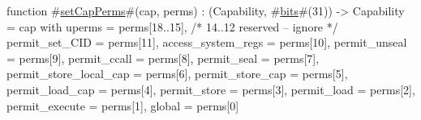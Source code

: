 function #\hyperref[sailMIPSzsetCapPerms]{setCapPerms}#(cap, perms) : (Capability, #\hyperref[sailMIPSzbits]{bits}#(31)) -> Capability =
    { cap with
      uperms                 = perms[18..15],
      /* 14..12 reserved -- ignore */
      permit_set_CID         = perms[11],
      access_system_regs     = perms[10],
      permit_unseal          = perms[9],
      permit_ccall           = perms[8],
      permit_seal            = perms[7],
      permit_store_local_cap = perms[6],
      permit_store_cap       = perms[5],
      permit_load_cap        = perms[4],
      permit_store           = perms[3],
      permit_load            = perms[2],
      permit_execute         = perms[1],
      global                 = perms[0]
      }
